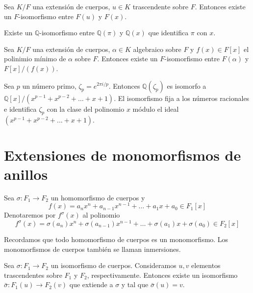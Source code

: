 \begin{theorem}
    Sea $K/F$ una extensión de cuerpos, $u \in K$ trascendente sobre $F$. Entonces existe un $F$-isomorfismo entre $F(u)$ y $F(x)$.
\end{theorem}

\begin{example}
    Existe un $\mathbb{Q}$-isomorfismo entre $\mathbb{Q}(\pi)$ y $\mathbb{Q}(x)$ que identifica $\pi$ con $x$.
\end{example}

\begin{theorem}
    Sea $K/F$ una extensión de cuerpos, $\alpha \in K$ algebraico sobre $F$ y $f(x) \in F[x]$ el polinimio mínimo de $\alpha$ sobre $F$. Entonces existe un $F$-isomorfismo entre $F(\alpha)$ y $F[x]/(f(x))$.
\end{theorem}

\begin{example}
    Sea $p$ un número primo, $\zeta_p = e^{2\pi i / p}$.
    Entonces $\mathbb{Q}(\zeta_p)$ es isomorfo a $\mathbb{Q}[x]/(x^{p-1} + x^{p-2} + \dots + x + 1)$.
    El isomorfismo fija a los números racionales e identifica $\zeta_p$ con la clase del polinomio $x$ módulo el ideal $(x^{p-1} + x^{p-2} + \dots + x + 1)$.
\end{example}

\section{Extensiones de monomorfismos de anillos}

\begin{definition}
    Sea $\sigma : F_1 \to F_2$ un homomorfismo de cuerpos y
    $$f(x) = a_nx^n + a_{n-1}x^{n-1} + \dots + a_1x + a_0 \in F_1[x]$$
    Denotaremos por $f^\sigma(x)$ al polinomio
    $$f^\sigma(x) = \sigma(a_n)x^n + \sigma(a_{n-1})x^{n-1} + \dots + \sigma(a_1)x + \sigma(a_0) \in F_2[x]$$
\end{definition}

\begin{remark}
    Recordamos que todo homomorfismo de cuerpos es un monomorfismo.
    Los monomorfismos de cuerpos también se llaman inmersiones.
\end{remark}

\begin{theorem}
    Sea $\sigma : F_1 \to F_2$ un isomorfismo de cuerpos.
    Consideramos $u, v$ elementos trascendentes sobre $F_1$ y $F_2$, respectivamente.
    Entonces existe un isomorfismo $\bar{\sigma} : F_1(u) \to F_2(v)$ que extiende a $\sigma$ y tal que $\bar{\sigma}(u) = v$.
\end{theorem}

